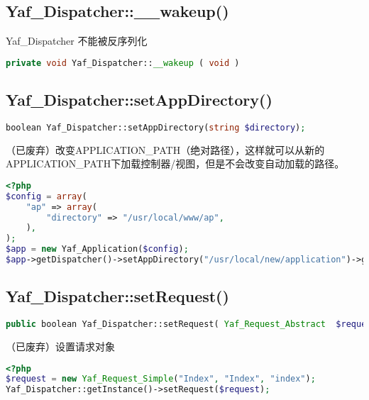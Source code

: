 \subsection{Yaf\_Dispatcher::\_\_wakeup()}

Yaf\_Dispatcher 不能被反序列化

\begin{lstlisting}[language=PHP]
private void Yaf_Dispatcher::__wakeup ( void )
\end{lstlisting}


\subsection{Yaf\_Dispatcher::setAppDirectory()}

\begin{lstlisting}[language=PHP]
boolean Yaf_Dispatcher::setAppDirectory(string $directory);
\end{lstlisting}

（已废弃）改变APPLICATION\_PATH（绝对路径），这样就可以从新的APPLICATION\_PATH下加载控制器/视图，但是不会改变自动加载的路径。


\begin{lstlisting}[language=PHP]
<?php
$config = array(
    "ap" => array(
        "directory" => "/usr/local/www/ap",
    ),
);
$app = new Yaf_Application($config);
$app->getDispatcher()->setAppDirectory("/usr/local/new/application")->getApplication()->run();
\end{lstlisting}


\subsection{Yaf\_Dispatcher::setRequest()}

\begin{lstlisting}[language=PHP]
public boolean Yaf_Dispatcher::setRequest( Yaf_Request_Abstract  $request );
\end{lstlisting}

（已废弃）设置请求对象



\begin{lstlisting}[language=PHP]
<?php
$request = new Yaf_Request_Simple("Index", "Index", "index");
Yaf_Dispatcher::getInstance()->setRequest($request);
\end{lstlisting}













